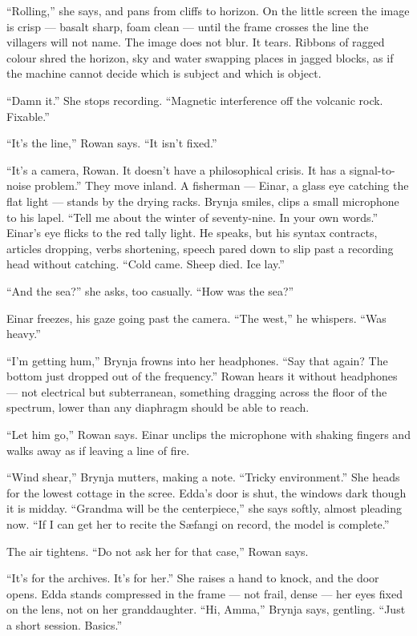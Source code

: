 \documentclass[11pt,oneside]{book}
\begin{document}
``Rolling,'' she says, and pans from cliffs to horizon. On the little
screen the image is crisp --- basalt sharp, foam clean --- until the
frame crosses the line the villagers will not name. The image does not
blur. It tears. Ribbons of ragged colour shred the horizon, sky and
water swapping places in jagged blocks, as if the machine cannot decide
which is subject and which is object.

``Damn it.'' She stops recording. ``Magnetic interference off the
volcanic rock. Fixable.''

``It's the line,'' Rowan says. ``It isn't fixed.''

``It's a camera, Rowan. It doesn't have a philosophical crisis. It has a
signal-to-noise problem.'' They move inland. A fisherman --- Einar, a
glass eye catching the flat light --- stands by the drying racks. Brynja
smiles, clips a small microphone to his lapel. ``Tell me about the
winter of seventy-nine. In your own words.'' Einar's eye flicks to the
red tally light. He speaks, but his syntax contracts, articles dropping,
verbs shortening, speech pared down to slip past a recording head
without catching. ``Cold came. Sheep died. Ice lay.''

``And the sea?'' she asks, too casually. ``How was the sea?''

Einar freezes, his gaze going past the camera. ``The west,'' he
whispers. ``Was heavy.''

``I'm getting hum,'' Brynja frowns into her headphones. ``Say that
again? The bottom just dropped out of the frequency.'' Rowan hears it
without headphones --- not electrical but subterranean, something
dragging across the floor of the spectrum, lower than any diaphragm
should be able to reach.

``Let him go,'' Rowan says. Einar unclips the microphone with shaking
fingers and walks away as if leaving a line of fire.

``Wind shear,'' Brynja mutters, making a note. ``Tricky environment.''
She heads for the lowest cottage in the scree. Edda's door is shut, the
windows dark though it is midday. ``Grandma will be the centerpiece,''
she says softly, almost pleading now. ``If I can get her to recite the
Sæfangi on record, the model is complete.''

The air tightens. ``Do not ask her for that case,'' Rowan says.

``It's for the archives. It's for her.'' She raises a hand to knock, and
the door opens. Edda stands compressed in the frame --- not frail, dense
--- her eyes fixed on the lens, not on her granddaughter. ``Hi, Amma,''
Brynja says, gentling. ``Just a short session. Basics.''
\end{document}
